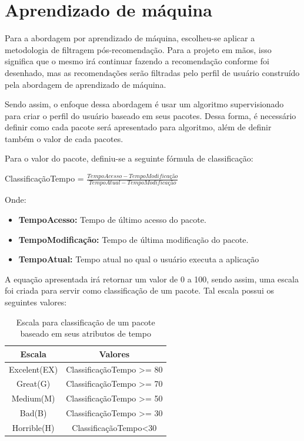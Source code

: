 \section{Aprendizado de máquina}

Para a abordagem por aprendizado de máquina, escolheu-se aplicar a
metodologia de filtragem pós-recomendação. Para a projeto em mãos, isso
significa que o mesmo irá continuar fazendo a recomendação conforme foi
desenhado, mas as recomendações serão filtradas pelo perfil de usuário
construído pela abordagem de aprendizado de máquina.

Sendo assim, o enfoque dessa abordagem é usar um algoritmo supervisionado
para criar o perfil do usuário baseado em seus pacotes. Dessa forma, é
necessário definir como cada pacote será apresentado para algoritmo, além de
definir também o valor de cada pacotes.

Para o valor do pacote, definiu-se a seguinte fórmula de classificação:

ClassificaçãoTempo = $\frac{TempoAcesso - TempoModificação}{TempoAtual -
TempoModificação}$


Onde:

\begin{itemize}
    \item \textbf{TempoAcesso:} Tempo de último acesso do pacote.
    \item \textbf{TempoModificação:} Tempo de última modificação do pacote.
    \item \textbf{TempoAtual:} Tempo atual no qual o usuário executa a
        aplicação
\end{itemize}


A equação apresentada irá retornar um valor de 0 a 100, sendo assim, uma
escala foi criada para servir como classificação de um pacote. Tal escala
possui os seguintes valores:

\begin{table}[h]
\centering
\begin{tabular}{cc}
\hline
\rowcolor[HTML]{EFEFEF} 
{Escala} & {Valores} \\ \hline
{Excelent(EX)}  & ClassificaçãoTempo >= 80                  \\ \hline
{Great(G)}   & ClassificaçãoTempo >= 70                  \\ \hline
{Medium(M)}   & ClassificaçãoTempo >= 50                  \\ \hline
{Bad(B)}   & ClassificaçãoTempo >= 30                  \\ \hline
{Horrible(H)}   &ClassificaçãoTempo<30                   \\ \hline
\end{tabular}
\caption{Escala para classificação de um pacote baseado em seus atributos de tempo}
\label{tab:cwe476-erros}
\end{table}  


